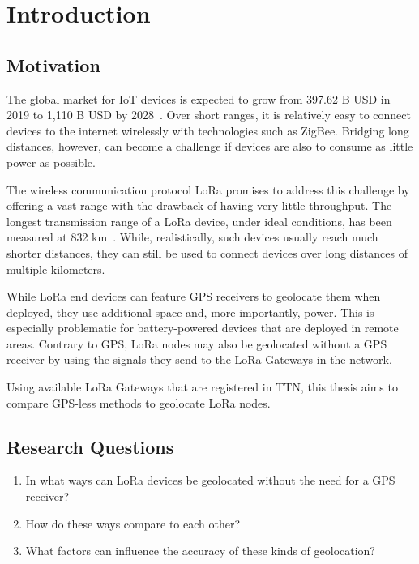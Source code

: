 \chapter{Introduction}

\section{Motivation}

The global market for IoT devices is expected to grow from 397.62 B USD in 2019 to 1,110 B USD by 2028~\cite{grand_view_research_global_2022}.
Over short ranges, it is relatively easy to connect devices to the internet wirelessly with technologies such as ZigBee.
Bridging long distances, however, can become a challenge if devices are also to consume as little power as possible.

The wireless communication protocol \ac{LoRa} promises to address this challenge by offering a vast range with the drawback of having very little throughput.
The longest transmission range of a \ac{LoRa} device, under ideal conditions, has been measured at 832 km~\cite{the_things_network_global_team_lora_nodate}.
While, realistically, such devices usually reach much shorter distances, they can still be used to connect devices over long distances of multiple kilometers.

While \ac{LoRa} end devices can feature \ac{GPS} receivers to geolocate them when deployed, they use additional space and, more importantly, power.
This is especially problematic for battery-powered devices that are deployed in remote areas.
Contrary to \ac{GPS}, \ac{LoRa} nodes may also be geolocated without a GPS receiver by using the signals they send to the \ac{LoRa} Gateways in the network.

Using available \ac{LoRa} Gateways that are registered in \acf{TTN}, this thesis aims to compare \ac{GPS}-less methods to geolocate \ac{LoRa} nodes.

\section{Research Questions}

\begin{enumerate}
    \item In what ways can \ac{LoRa} devices be geolocated without the need for a GPS receiver?
    \item How do these ways compare to each other?
    \item What factors can influence the accuracy of these kinds of geolocation?
\end{enumerate}

